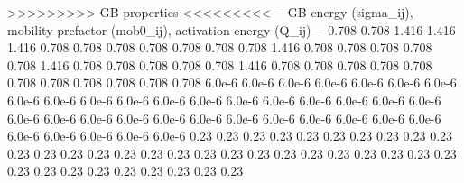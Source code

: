 >>>>>>>>> GB properties <<<<<<<<<
---GB energy (sigma_ij), mobility prefactor (mob0_ij), activation energy (Q_ij)---
0.708 0.708 1.416 1.416 1.416 0.708
0.708 0.708 0.708 0.708 0.708 0.708
1.416 0.708 0.708 0.708 0.708 0.708
1.416 0.708 0.708 0.708 0.708 0.708
1.416 0.708 0.708 0.708 0.708 0.708
0.708 0.708 0.708 0.708 0.708 0.708
6.0e-6 6.0e-6 6.0e-6 6.0e-6 6.0e-6 6.0e-6
6.0e-6 6.0e-6 6.0e-6 6.0e-6 6.0e-6 6.0e-6
6.0e-6 6.0e-6 6.0e-6 6.0e-6 6.0e-6 6.0e-6
6.0e-6 6.0e-6 6.0e-6 6.0e-6 6.0e-6 6.0e-6
6.0e-6 6.0e-6 6.0e-6 6.0e-6 6.0e-6 6.0e-6
6.0e-6 6.0e-6 6.0e-6 6.0e-6 6.0e-6 6.0e-6
0.23 0.23 0.23 0.23 0.23 0.23
0.23 0.23 0.23 0.23 0.23 0.23
0.23 0.23 0.23 0.23 0.23 0.23
0.23 0.23 0.23 0.23 0.23 0.23
0.23 0.23 0.23 0.23 0.23 0.23
0.23 0.23 0.23 0.23 0.23 0.23
